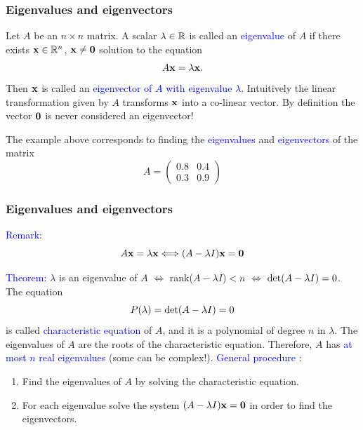 \documentclass[11pt,aspectratio=169]{beamer}
\begin{document}
\begin{frame}
\frametitle{Eigenvalues and eigenvectors }
\begin{small}
Let $A$ be an $n \times n$ matrix. A scalar $\lambda \in \mathbb R$ is called an \textcolor{blue}{eigenvalue} of $A$ if there exists ${\bf x} \in \mathbb R^n$, ${\bf x} \neq {\bf 0}$ solution to the equation
$$
A {\bf x}=\lambda {\bf x}.
$$
Then ${\bf x}$ is called an \textcolor{blue}{eigenvector of $A$ with eigenvalue $\lambda$}.
\vskip 12pt
Intuitively the linear transformation given by $A$ transforms ${\bf x}$ into a co-linear  vector.
\vskip 12pt
By definition the vector ${\bf 0}$ is never considered an eigenvector!

\vskip 12pt
The example above corresponds to finding the \textcolor{blue}{eigenvalues} and \textcolor{blue}{eigenvectors} of the matrix $$A=\begin{pmatrix}
0.8 & 0.4  \\
0.3 & 0.9
\end{pmatrix}$$


\end{small}
\end{frame}

\begin{frame}
\frametitle{Eigenvalues and eigenvectors }
\begin{small}
\textcolor{blue}{Remark:}  $$
A {\bf x}=\lambda {\bf x} \Longleftrightarrow (A-\lambda I) {\bf x}={\bf 0}$$

\textcolor{blue}{Theorem:} $\lambda$ is an eigenvalue of $A$ 
 $\Leftrightarrow$ rank($A-\lambda I$)$<n$
$\Leftrightarrow$ $\textnormal{det}(A-\lambda I)=0$.
\vskip 12pt
The equation $$P(\lambda)=\textnormal{det}(A-\lambda I)=0$$ is called \textcolor{blue}{characteristic equation} of $A$, and it is a polynomial of degree $n$ in $\lambda$. The eigenvalues of $A$ are the roots of the characteristic equation.
Therefore, $A$ has \textcolor{blue}{at most $n$ real eigenvalues} (some can be complex!).
\vskip 12pt
\textcolor{blue}{General procedure :}
\begin{enumerate}
\item Find the eigenvalues of $A$ by solving the characteristic equation.
\item For each eigenvalue solve the system $(A-\lambda I) {\bf x}={\bf 0}$ in order to find the eigenvectors.
\end{enumerate}



\end{small}
\end{frame}
\end{document}
